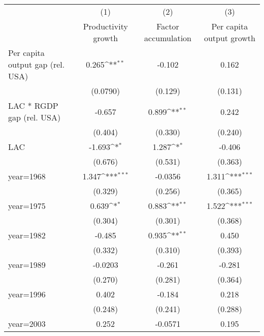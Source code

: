 {
\def\sym#1{\ifmmode^{#1}\else\(^{#1}\)\fi}
\begin{tabular}{l*{3}{c}}
\hline\hline
                    &\multicolumn{1}{c}{(1)}&\multicolumn{1}{c}{(2)}&\multicolumn{1}{c}{(3)}\\
                    &\multicolumn{1}{c}{Productivity growth}&\multicolumn{1}{c}{Factor accumulation}&\multicolumn{1}{c}{Per capita output growth}\\
\hline
Per capita output gap (rel. USA)&       0.265\sym{**} &      -0.102         &       0.162         \\
                    &    (0.0790)         &     (0.129)         &     (0.131)         \\
[1em]
LAC * RGDP gap (rel. USA)&      -0.657         &       0.899\sym{**} &       0.242         \\
                    &     (0.404)         &     (0.330)         &     (0.240)         \\
[1em]
LAC                 &      -1.693\sym{*}  &       1.287\sym{*}  &      -0.406         \\
                    &     (0.676)         &     (0.531)         &     (0.363)         \\
[1em]
year=1968           &       1.347\sym{***}&     -0.0356         &       1.311\sym{***}\\
                    &     (0.329)         &     (0.256)         &     (0.365)         \\
[1em]
year=1975           &       0.639\sym{*}  &       0.883\sym{**} &       1.522\sym{***}\\
                    &     (0.304)         &     (0.301)         &     (0.368)         \\
[1em]
year=1982           &      -0.485         &       0.935\sym{**} &       0.450         \\
                    &     (0.332)         &     (0.310)         &     (0.393)         \\
[1em]
year=1989           &     -0.0203         &      -0.261         &      -0.281         \\
                    &     (0.270)         &     (0.281)         &     (0.364)         \\
[1em]
year=1996           &       0.402         &      -0.184         &       0.218         \\
                    &     (0.248)         &     (0.241)         &     (0.288)         \\
[1em]
year=2003           &       0.252         &     -0.0571         &       0.195         \\

\end{tabular}}
